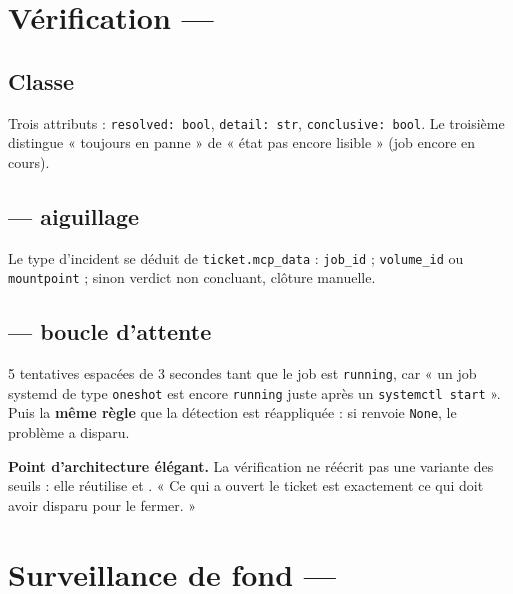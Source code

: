 \section{Vérification --- }

\subsection*{Classe }
Trois attributs : \texttt{resolved: bool}, \texttt{detail: str},
\texttt{conclusive: bool}. Le troisième distingue « toujours en panne » de
« état pas encore lisible » (job encore en cours).

\subsection*{ --- aiguillage}
Le type d'incident se déduit de \texttt{ticket.mcp\_data} :
\texttt{job\_id} \arrowto{}  ;
\texttt{volume\_id} ou \texttt{mountpoint} \arrowto{}  ;
sinon \arrowto{} verdict non concluant, clôture manuelle.

\subsection*{ --- boucle d'attente}
5 tentatives espacées de 3 secondes tant que le job est \texttt{running}, car
« un job systemd de type \texttt{oneshot} est encore \texttt{running} juste
après un \texttt{systemctl start} ». Puis la \textbf{même règle} que la
détection est réappliquée : si  renvoie
\texttt{None}, le problème a disparu.

\begin{keybox}
\textbf{Point d'architecture élégant.} La vérification ne réécrit pas une
variante des seuils : elle réutilise  et
. « Ce qui a ouvert le ticket est exactement ce qui
doit avoir disparu pour le fermer. »
\end{keybox}

\section{Surveillance de fond --- }

